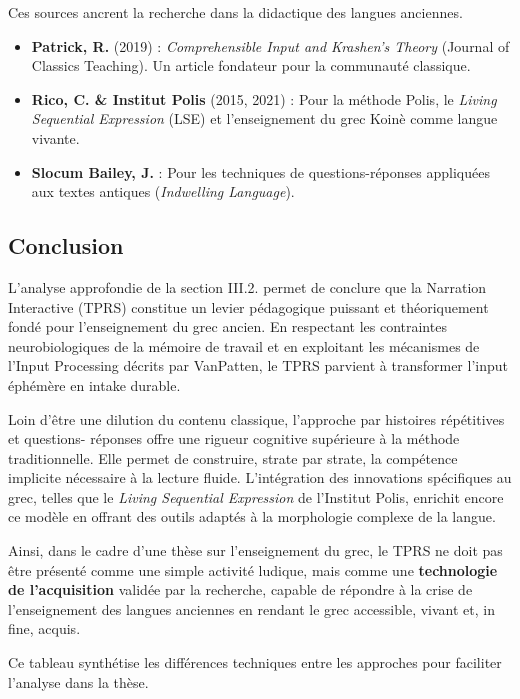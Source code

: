 Ces sources ancrent la recherche dans la didactique des langues anciennes.

\begin{itemize}\item \textbf{Patrick, R.} (2019) : \textit{Comprehensible Input and Krashen's Theory} (Journal of Classics Teaching). Un article fondateur pour la communauté classique.\cite{III-2-3-ref17}\item \textbf{Rico, C. \& Institut Polis} (2015, 2021) : Pour la méthode Polis, le \textit{Living Sequential Expression} (LSE) et l'enseignement du grec Koinè comme langue vivante.\cite{III-2-3-ref21}\item \textbf{Slocum Bailey, J.} : Pour les techniques de questions-réponses appliquées aux textes antiques (\textit{Indwelling Language}).\cite{III-2-3-ref30}\end{itemize}

\subsection{Conclusion}

L'analyse approfondie de la section III.2.\cite{III-2-3-ref3} permet de conclure que la Narration
Interactive (TPRS) constitue un levier pédagogique puissant et théoriquement fondé pour
l'enseignement du grec ancien. En respectant les contraintes neurobiologiques de la mémoire de
travail et en exploitant les mécanismes de l'Input Processing décrits par VanPatten, le TPRS
parvient à transformer l'input éphémère en intake durable.

Loin d'être une dilution du contenu classique, l'approche par histoires répétitives et questions-
réponses offre une rigueur cognitive supérieure à la méthode traditionnelle. Elle permet de
construire, strate par strate, la compétence implicite nécessaire à la lecture fluide. L'intégration
des innovations spécifiques au grec, telles que le \textit{Living Sequential Expression} de
l'Institut Polis, enrichit encore ce modèle en offrant des outils adaptés à la morphologie complexe
de la langue.

Ainsi, dans le cadre d'une thèse sur l'enseignement du grec, le TPRS ne doit pas être présenté comme
une simple \og activité ludique\fg{}, mais comme une \textbf{technologie de l'acquisition} validée
par la recherche, capable de répondre à la crise de l'enseignement des langues anciennes en rendant
le grec accessible, vivant et, in fine, acquis.

Ce tableau synthétise les différences techniques entre les approches pour faciliter l'analyse dans
la thèse.

